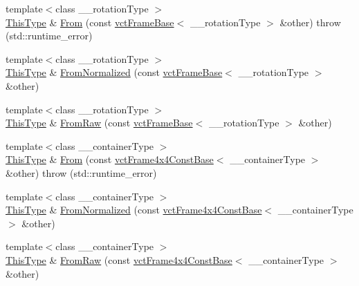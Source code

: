 \begin{DoxyCompactItemize}
\item 
{\footnotesize template$<$class \-\_\-\-\_\-rotation\-Type $>$ }\\\hyperlink{classvct_frame_base_a076f1fe4fc957faa0d1ff7450d1cb768}{This\-Type} \& \hyperlink{classvct_frame_base_a4537cd5e23393fde7e9211ab36e392f1}{From} (const \hyperlink{classvct_frame_base}{vct\-Frame\-Base}$<$ \-\_\-\-\_\-rotation\-Type $>$ \&other)  throw (std\-::runtime\-\_\-error)
\item 
{\footnotesize template$<$class \-\_\-\-\_\-rotation\-Type $>$ }\\\hyperlink{classvct_frame_base_a076f1fe4fc957faa0d1ff7450d1cb768}{This\-Type} \& \hyperlink{classvct_frame_base_acc35022fb94913d6bff04d70763bfc34}{From\-Normalized} (const \hyperlink{classvct_frame_base}{vct\-Frame\-Base}$<$ \-\_\-\-\_\-rotation\-Type $>$ \&other)
\item 
{\footnotesize template$<$class \-\_\-\-\_\-rotation\-Type $>$ }\\\hyperlink{classvct_frame_base_a076f1fe4fc957faa0d1ff7450d1cb768}{This\-Type} \& \hyperlink{classvct_frame_base_a3def45ce47d7a4b25844b6828aaa9ae7}{From\-Raw} (const \hyperlink{classvct_frame_base}{vct\-Frame\-Base}$<$ \-\_\-\-\_\-rotation\-Type $>$ \&other)
\end{DoxyCompactItemize}

{\bf }\par
\begin{DoxyCompactItemize}
\item 
{\footnotesize template$<$class \-\_\-\-\_\-container\-Type $>$ }\\\hyperlink{classvct_frame_base_a076f1fe4fc957faa0d1ff7450d1cb768}{This\-Type} \& \hyperlink{classvct_frame_base_a730a6f6e4a6f09cad8f14c9359cdba48}{From} (const \hyperlink{classvct_frame4x4_const_base}{vct\-Frame4x4\-Const\-Base}$<$ \-\_\-\-\_\-container\-Type $>$ \&other)  throw (std\-::runtime\-\_\-error)
\item 
{\footnotesize template$<$class \-\_\-\-\_\-container\-Type $>$ }\\\hyperlink{classvct_frame_base_a076f1fe4fc957faa0d1ff7450d1cb768}{This\-Type} \& \hyperlink{classvct_frame_base_af9e36e2855beb5c6339474f7a2bd15ad}{From\-Normalized} (const \hyperlink{classvct_frame4x4_const_base}{vct\-Frame4x4\-Const\-Base}$<$ \-\_\-\-\_\-container\-Type $>$ \&other)
\item 
{\footnotesize template$<$class \-\_\-\-\_\-container\-Type $>$ }\\\hyperlink{classvct_frame_base_a076f1fe4fc957faa0d1ff7450d1cb768}{This\-Type} \& \hyperlink{classvct_frame_base_a994b37869118a01d191f97d6a1c78cf8}{From\-Raw} (const \hyperlink{classvct_frame4x4_const_base}{vct\-Frame4x4\-Const\-Base}$<$ \-\_\-\-\_\-container\-Type $>$ \&other)
\end{DoxyCompactItemize}

